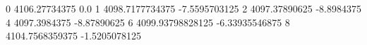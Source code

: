 0 4106.27734375 0.0
1 4098.7177734375 -7.5595703125
2 4097.37890625 -8.8984375
4 4097.3984375 -8.87890625
6 4099.93798828125 -6.33935546875
8 4104.7568359375 -1.5205078125
